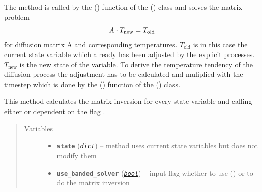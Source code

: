 \documentclass[a4paper,10pt,english]{sphinxmanual}
\begin{document}
\begin{fulllineitems}
\begin{fulllineitems}
The method is called by the 
{\hyperref[api/climlab.process:climlab.process.implicit.ImplicitProcess._compute]{\emph{}}} () function 
of the {\hyperref[api/climlab.process:climlab.process.implicit.ImplicitProcess]{\emph{}}} () class and 
solves the matrix problem
\begin{gather}
\begin{split}A \cdot T_{\textrm{new}} = T_{\textrm{old}}\end{split}\notag
\end{gather}
for diffusion matrix A and corresponding temperatures. 
\(T_{\textrm{old}}\) is in this case the current state variable 
which already has been adjusted by the explicit processes. 
\(T_{\textrm{new}}\) is the new state of the variable. To
derive the temperature tendency of the diffusion process the adjustment 
has to be calculated and muliplied with the timestep which is done by
the {\hyperref[api/climlab.process:climlab.process.implicit.ImplicitProcess._compute]{\emph{}}} () 
function of the {\hyperref[api/climlab.process:climlab.process.implicit.ImplicitProcess]{\emph{}}} () 
class.

This method calculates the matrix inversion for every state variable
and calling either  or 
\href{http://docs.scipy.org/doc/numpy/reference/generated/numpy.linalg.solve.html\#numpy.linalg.solve}{} dependent on the flag 
.
\begin{quote}\begin{description}
\item[{Variables}] \leavevmode\begin{itemize}
\item {} 
\textbf{\texttt{state}} (\href{http://docs.python.org/2.7/library/stdtypes.html\#dict}{\emph{\texttt{dict}}}) -- method uses current state variables
but does not modify them

\item {} 
\textbf{\texttt{use\_banded\_solver}} (\href{http://docs.python.org/2.7/library/functions.html\#bool}{\emph{\texttt{bool}}}) -- input flag whether to use 
{\hyperref[api/climlab.dynamics:climlab.dynamics.diffusion._solve_implicit_banded]{\emph{}}} () or 
\href{http://docs.scipy.org/doc/numpy/reference/generated/numpy.linalg.solve.html\#numpy.linalg.solve}{} to do 
the matrix inversion


\end{itemize}
\end{description}
\end{quote}
\end{fulllineitems}
\end{fulllineitems}
\end{document}
